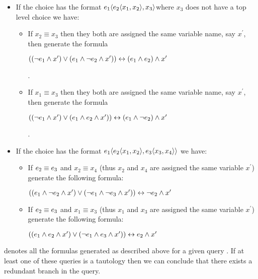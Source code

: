 \documentclass[12pt]{article}
\begin{document}
\begin{itemize}
\item If the choice has the format $\chc [\dimMeta_1] {\chc [\dimMeta_2] {x_1, x_2}, x_3} $where $x_3$
does not have a top level choice we have:
\begin{itemize}
\item 
If $x_2 \equiv x_3 $ then they both are assigned the same variable name, say $x^\prime$, then generate the formula\\
\centerline{$\left(\left(\neg \dimMeta_1 \wedge x^\prime\right) \vee \left( \dimMeta_1 \wedge \neg\dimMeta_2 \wedge x^\prime\right)\right) \leftrightarrow \left(\dimMeta_1 \wedge \dimMeta_2 \right) \wedge x^\prime$}.
\item
If $x_1 \equiv x_3 $ then they both are assigned the same variable name, say $x^\prime$, then generate the formula\\
\centerline{$\left(\left(\neg \dimMeta_1 \wedge x^\prime\right) \vee \left( \dimMeta_1 \wedge \dimMeta_2 \wedge x^\prime\right)\right) \leftrightarrow \left(\dimMeta_1 \wedge \neg \dimMeta_2 \right) \wedge x^\prime$}.
\end{itemize}
\item If the choice has the format $\chc [\dimMeta_1] {\chc [\dimMeta_2] {x_1, x_2}, \chc [\dimMeta_3] {x_3, x_4}} $ we have:
\begin{itemize}
\item 
If $\dimMeta_2 \equiv \dimMeta_3$ and $x_2 \equiv x_4$ (thus $x_2$ and $x_4$ are assigned the same variable $x^\prime$) generate the following formula:\\
\centerline{$\left(\left( \dimMeta_1 \wedge \neg \dimMeta_2 \wedge x^\prime\right) \vee
\left(\neg \dimMeta_1 \wedge \neg \dimMeta_3 \wedge x^\prime\right)\right) \leftrightarrow \neg \dimMeta_2 \wedge x^\prime$}
\item 
If $\dimMeta_2 \equiv \dimMeta_3$ and $x_1 \equiv x_3$ (thus $x_1$ and $x_3$ are assigned the same variable $x^\prime$) generate the following formula:\\
\centerline{$\left(\left( \dimMeta_1 \wedge  \dimMeta_2 \wedge x^\prime\right) \vee
\left(\neg \dimMeta_1 \wedge  \dimMeta_3 \wedge x^\prime\right)\right) \leftrightarrow  \dimMeta_2 \wedge x^\prime$}\end{itemize}
\end{itemize}

\rdnt \vQ denotes all the formulas generated as described above for a given query \vQ.
If at least one of these queries is a tautology then we can conclude that there exists 
a redundant branch in the query. 
\end{document}
